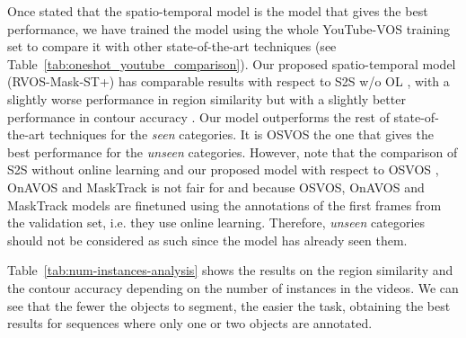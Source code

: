 \documentclass[10pt,twocolumn,letterpaper]{article}
\begin{document}
Once stated that the spatio-temporal model is the model that gives the best performance, we have trained the model using the whole YouTube-VOS training set to compare it with other state-of-the-art techniques (see Table~\ref{tab:oneshot_youtube_comparison}). Our proposed spatio-temporal model (RVOS-Mask-ST+) has comparable results with respect to S2S w/o OL \cite{xu2018youtube-benchmark}, with a slightly worse performance in region similarity  but with a slightly better performance in contour accuracy . Our model outperforms the rest of state-of-the-art techniques \cite{caelles2017one,perazzi2017learning,yang2018efficient,voigtlaender2017online} for the \emph{seen} categories. It is OSVOS \cite{caelles2017one} the one that gives the best performance for the \emph{unseen} categories. However, note that the comparison of S2S without online learning \cite{xu2018youtube-benchmark} and our proposed model with respect to OSVOS \cite{caelles2017one}, OnAVOS \cite{voigtlaender2017online} and MaskTrack \cite{perazzi2017learning} is not fair for  and  because OSVOS, OnAVOS and MaskTrack models are finetuned using the annotations of the first frames from the validation set, i.e. they use online learning. Therefore, \emph{unseen} categories should not be considered as such since the model has already seen them.

\begin{table}[]
\centering
{}
\caption{Comparison against state of the art VOS techniques for one-shot VOS on YouTube-VOS validation set. OL refers to online learning. The table is split in two parts, depending on whether the techniques use online learning or not.}
\label{tab:oneshot_youtube_comparison}
\end{table}
Table~\ref{tab:num-instances-analysis} shows the results on the region similarity  and the contour accuracy  depending on the number of instances in the videos. We can see that the fewer the objects to segment, the easier the task, obtaining the best results for sequences where only one or two objects are annotated. 
\end{document}
